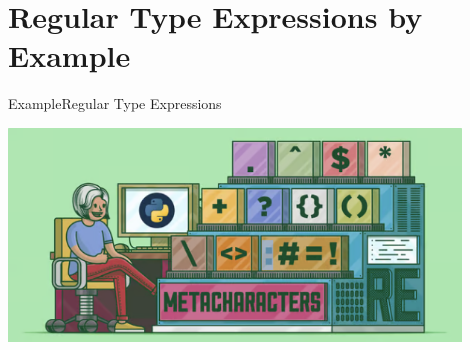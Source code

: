 \section{Regular Type Expressions by Example}

{  %
\begin{frame}{Example}{Regular Type Expressions}
  \centering
  
  \includegraphics[width=0.9\textwidth]{regexp.png}
\end{frame}
}

